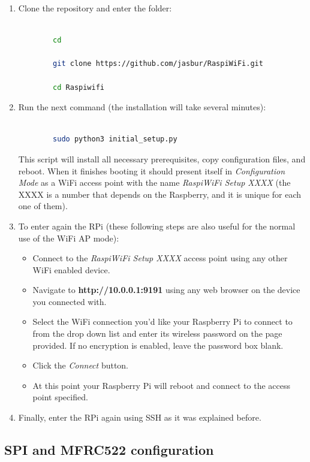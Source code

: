 \documentclass[12pt,a4paper,oneside]{article} %
\begin{document}
\begin{enumerate}
	\item Clone the repository and enter the folder:
	\begin{lstlisting}[language=sh]
	
		cd
		
		git clone https://github.com/jasbur/RaspiWiFi.git
		
		cd Raspiwifi
	\end{lstlisting}
	\item Run the next command (the installation will take several minutes):
	\begin{lstlisting}[language=sh]
	
		sudo python3 initial_setup.py
	\end{lstlisting}
	
	This script will install all necessary prerequisites, copy configuration files, and reboot. When it finishes booting it should present itself in \textit{Configuration Mode} as a WiFi access point with the name \textit{RaspiWiFi Setup XXXX} (the XXXX is a number that depends on the Raspberry, and it is unique for each one of them).
	\item To enter again the RPi (these following steps are also useful for the normal use of the WiFi AP mode):
	\begin{itemize}
		\item Connect to the \textit{RaspiWiFi Setup XXXX} access point using any other WiFi enabled device.
		\item Navigate to \textbf{http://10.0.0.1:9191} using any web browser on the device you connected with.
		\item Select the WiFi connection you'd like your Raspberry Pi to connect to from the drop down list and enter its wireless password on the page provided. If no encryption is enabled, leave the password box blank.
		\item Click the \textit{Connect} button.
		\item At this point your Raspberry Pi will reboot and connect to the access point specified.
	\end{itemize}
	\item Finally, enter the RPi again using SSH as it was explained before.
\end{enumerate}

\subsection{SPI and MFRC522 configuration}
\end{document}
